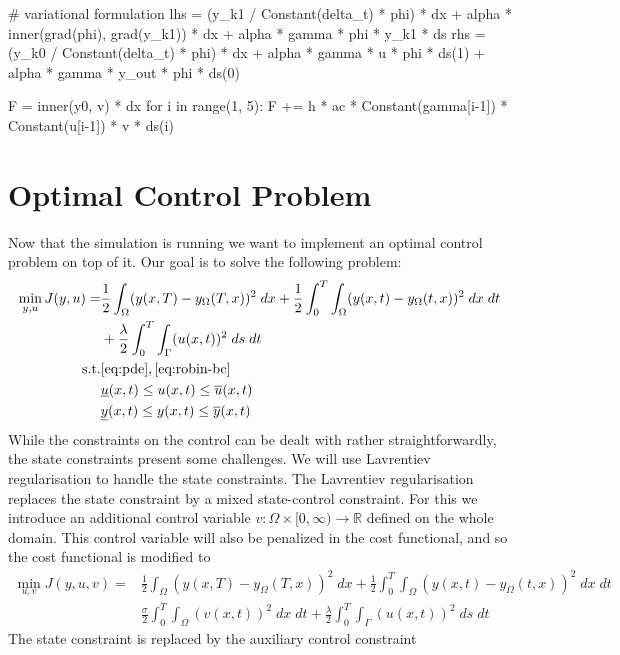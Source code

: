 \documentclass[
12pt, %
a4paper, %
onecolumn, %
portrait %
]{article}
\begin{document}
\begin{python}
# variational formulation
lhs = (y_k1 / Constant(delta_t) * phi) * dx + alpha * inner(grad(phi), grad(y_k1)) * dx + alpha * gamma * phi * y_k1 * ds
rhs = (y_k0 / Constant(delta_t) * phi) * dx + alpha * gamma * u * phi * ds(1) + alpha * gamma * y_out * phi * ds(0)
\end{python}


\begin{python}
F = inner(y0, v) * dx
for i in range(1, 5):
    F += h * ac * Constant(gamma[i-1]) * Constant(u[i-1]) * v * ds(i)
\end{python}

\section{Optimal Control Problem}
Now that the simulation is running we want to implement an optimal control problem on top of it. Our goal is to solve the following problem:
\begin{align*}
\min_{y,u} J(y, u) = & \frac{1}{2}\int_{\Omega} (y(x, T) - y_{\Omega}(T,x))^2 \; dx + \frac{1}{2} \int_{0}^{T} \int_{\Omega} (y(x,t) - y_{\Omega}(t,x))^2 \; dx \; dt \\
& + \frac{\lambda}{2} \int_{0}^{T} \int_{\Gamma} (u(x,t))^2 \; ds \; dt \\
\text{s.t.} & \eqref{eq:pde}, \eqref{eq:robin-bc} \\
& \underline{u}(x,t) \leq u(x,t) \leq \overline{u}(x,t) \\
& \underline{y}(x,t) \leq y(x,t) \leq \overline{y}(x,t)
\end{align*}
While the constraints on the control can be dealt with rather straightforwardly, the state constraints present some challenges. We will use Lavrentiev regularisation to handle the state constraints. The Lavrentiev regularisation replaces the state constraint by a mixed state-control constraint. For this we introduce an additional control variable $v : \Omega \times [0, \infty) \rightarrow \mathbb{R}$ defined on the whole domain. This control variable will also be penalized in the cost functional, and so the cost functional is modified to
\begin{align*}
\min_{u,v} J(y, u, v) = & \frac{1}{2}\int_{\Omega} (y(x, T) - y_{\Omega}(T,x))^2 \; dx + \frac{1}{2} \int_{0}^{T} \int_{\Omega} (y(x,t) - y_{\Omega}(t,x))^2 \; dx \; dt \\
& \frac{\sigma}{2} \int_{0}^{T} \int_{\Omega} (v(x,t))^2 \; dx \; dt 
+ \frac{\lambda}{2} \int_{0}^{T} \int_{\Gamma} (u(x,t))^2 \; ds \; dt
\end{align*}
The state constraint is replaced by the auxiliary control constraint
\end{document}

